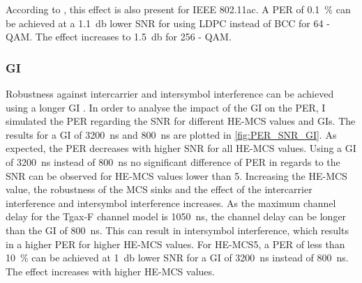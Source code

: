 According to \textcite{tran_asic_2014}, this effect is also present for IEEE 802.11ac. A \ac{PER} of \SI{0.1}{\percent} can be achieved at a
\SI{1.1}{\decibel} lower \ac{SNR} for using \ac{LDPC} instead of \ac{BCC} for 64 - \ac{QAM}. The effect increases to \SI{1.5}{\decibel} for 256 - \ac{QAM}.

\subsubsection*{\acf{GI}}

Robustness against intercarrier and intersymbol interference can be achieved using a longer \ac{GI} \cite{pulimamidi_development_2007}. In order to analyse the impact of the \ac{GI} on the \ac{PER},
I simulated the \ac{PER} regarding the \ac{SNR} for different \ac{HE}-\ac{MCS} values and \ac{GI}s. The results for a \ac{GI} of \SI{3200}{\nano\second} and \SI{800}{\nano\second} are plotted in \autoref{fig:PER_SNR_GI}.
As expected, the \ac{PER} decreases with higher \ac{SNR} for all \ac{HE}-\ac{MCS} values. Using a \ac{GI} of \SI{3200}{\nano\second} instead of \SI{800}{\nano\second} no significant difference of \ac{PER} in regards to the \ac{SNR} can be observed for \ac{HE}-\ac{MCS} values lower than \num{5}.
Increasing the \ac{HE}-\ac{MCS} value, the robustness of the \ac{MCS} sinks and the effect of the intercarrier interference and intersymbol interference increases.
As the maximum channel delay for the Tgax-F channel model is \SI{1050}{\nano\second}, the channel delay can be longer than the \ac{GI} of \SI{800}{\nano\second}. This
can result in intersymbol interference, which results in a higher \ac{PER} for higher \ac{HE}-\ac{MCS} values.
For \ac{HE}-\ac{MCS}\num{5}, a \ac{PER} of less than \SI{10}{\percent} can be achieved at \SI{1}{\decibel} lower \ac{SNR} for a \ac{GI} of \SI{3200}{\nano\second} instead of \SI{800}{\nano\second}. The effect increases
with higher \ac{HE}-\ac{MCS} values.

